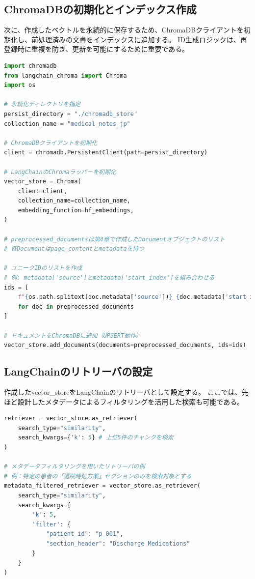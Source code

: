 \documentclass[12pt,a4paper]{jsarticle}
\begin{document}
\subsection{ChromaDBの初期化とインデックス作成}
次に、作成したベクトルを永続的に保存するため、ChromaDBクライアントを初期化し、前処理済みの文書をインデックスに追加する。
ID生成ロジックは、再登録時に重複を防ぎ、更新を可能にするために重要である。
\begin{lstlisting}[language=Python, label=lst:chroma_init, caption=ChromaDBの初期化とインデックス作成]
import chromadb
from langchain_chroma import Chroma
import os

# 永続化ディレクトリを指定
persist_directory = "./chromadb_store"
collection_name = "medical_notes_jp"

# ChromaDBクライアントを初期化
client = chromadb.PersistentClient(path=persist_directory)

# LangChainのChromaラッパーを初期化
vector_store = Chroma(
    client=client,
    collection_name=collection_name,
    embedding_function=hf_embeddings,
)

# preprocessed_documentsは第4章で作成したDocumentオブジェクトのリスト
# 各Documentはpage_contentとmetadataを持つ

# ユニークIDのリストを作成
# 例: metadata['source']とmetadata['start_index']を組み合わせる
ids = [
    f"{os.path.splitext(doc.metadata['source'])}_{doc.metadata['start_index']}"
    for doc in preprocessed_documents
]

# ドキュメントをChromaDBに追加（UPSERT動作）
vector_store.add_documents(documents=preprocessed_documents, ids=ids)
\end{lstlisting}

\subsection{LangChainのリトリーバの設定}
作成したvector\_storeをLangChainのリトリーバとして設定する。
ここでは、先ほど設計したメタデータによるフィルタリングを活用した検索も可能である。
\begin{lstlisting}[language=Python, label=lst:retriever, caption=LangChainのリトリーバの設定]
retriever = vector_store.as_retriever(
    search_type="similarity",
    search_kwargs={'k': 5} # 上位5件のチャンクを検索
)

# メタデータフィルタリングを用いたリトリーバの例
# 例：特定の患者の「退院時処方薬」セクションのみを検索対象とする
metadata_filtered_retriever = vector_store.as_retriever(
    search_type="similarity",
    search_kwargs={
        'k': 5,
        'filter': {
            "patient_id": "p_001",
            "section_header": "Discharge Medications"
        }
    }
)
\end{lstlisting}
\end{document}
